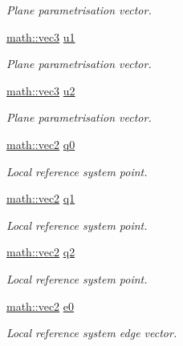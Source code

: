 \begin{DoxyCompactItemize}
\begin{DoxyCompactList}\small\item\em Plane parametrisation vector. \end{DoxyCompactList}\item 
\hyperlink{structphysim_1_1math_1_1vec3}{math\+::vec3} \hyperlink{classphysim_1_1geometry_1_1triangle_a4af756a7338103b26dd60e1663fe1279}{u1}
\begin{DoxyCompactList}\small\item\em Plane parametrisation vector. \end{DoxyCompactList}\item 
\hyperlink{structphysim_1_1math_1_1vec3}{math\+::vec3} \hyperlink{classphysim_1_1geometry_1_1triangle_a179ce681e75d39b776b54ec104f956a1}{u2}
\begin{DoxyCompactList}\small\item\em Plane parametrisation vector. \end{DoxyCompactList}\item 
\hyperlink{structphysim_1_1math_1_1vec2}{math\+::vec2} \hyperlink{classphysim_1_1geometry_1_1triangle_a5484f51c5b3eeb278be2b8bb1e2652ca}{q0}
\begin{DoxyCompactList}\small\item\em Local reference system point. \end{DoxyCompactList}\item 
\hyperlink{structphysim_1_1math_1_1vec2}{math\+::vec2} \hyperlink{classphysim_1_1geometry_1_1triangle_a658747d09ec843033d9657301eb753e9}{q1}
\begin{DoxyCompactList}\small\item\em Local reference system point. \end{DoxyCompactList}\item 
\hyperlink{structphysim_1_1math_1_1vec2}{math\+::vec2} \hyperlink{classphysim_1_1geometry_1_1triangle_a4857cf46530b169470ebaa5d4a94b7af}{q2}
\begin{DoxyCompactList}\small\item\em Local reference system point. \end{DoxyCompactList}\item 
\hyperlink{structphysim_1_1math_1_1vec2}{math\+::vec2} \hyperlink{classphysim_1_1geometry_1_1triangle_a848982c72944fee96e266cae874b0553}{e0}
\begin{DoxyCompactList}\small\item\em Local reference system edge vector. \end{DoxyCompactList}\item 

\end{DoxyCompactItemize}
